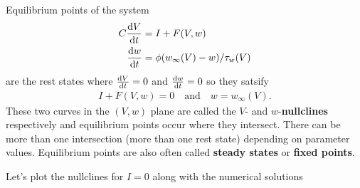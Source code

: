 \documentclass[11pt]{article}
\begin{document}
Equilibrium points of the system \begin{align*}
C \frac{{\rm d} V}{{\rm d} t}  &= I + F(V, w)\\
 \frac{{\rm d} w}{{\rm d} t} & = \phi (w_\infty(V)-w)/ \tau_w(V)
\end{align*} are the rest states where \(\frac{{\rm d} V}{{\rm d} t}=0\)
and \(\frac{{\rm d} w}{{\rm d} t}=0\) so they satsify \begin{align*}
 I + F(V, w)=0 \quad \mbox{and} \quad w=w_\infty(V).
\end{align*} These two curves in the \((V, w)\) plane are called the
\(V\)- and \(w\)-\textbf{nullclines} respectively and equilibrium points
occur where they intersect. There can be more than one intersection
(more than one rest state) depending on parameter values. Equilibrium
points are also often called \textbf{steady states} or \textbf{fixed
points}.

Let's plot the nullclines for \(I=0\) along with the numerical solutions
\end{document}
